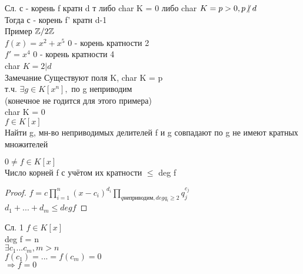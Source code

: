 Сл. с - корень f кратн d т либо char K = 0 либо char $K = p > 0, p \centernot| d $ \\
Тогда с - корень f' кратн d-1 \\
Пример $ \mathbb{Z} / 2\mathbb{Z}  $ \\
$ f(x) = x^2 + x^5 $ 0 - корень кратности 2 \\
$ f' = x^4 $  0 - корень кратности 4 \\
char $ K = 2 | d $ \\
Замечание Существуют поля K, char K = p \\
т.ч. $ \exists g \in K[x^n], $ по g неприводим \\
(конечное не годится для этого примера) \\
char K = 0 \\
$ f \in K[x] $\\
Найти g, мн-во неприводимых делителей f и g совпадают по g не имеют кратных множителей \\

\begin{theorem}
	$ 0 \neq f \in K[x] $\\
	Число корней f  с учётом их кратности $ \leq $ deg f \\
	\begin{proof}
		$ f = c \prod_{i=1}^{n} (x - c_i)^{d_i} \prod_{q \text{неприводим}, deg q_i \geq 2} q_j^{c_j} $ \\
		$ d_1 + ... +d_m \leq deg f $ 
	\end{proof} 
\end{theorem}
Сл. 1 $ f \in K[x] $ \\
deg f = n \\
$ \exists c_1 ... c_m, m > n $ \\
$ f(c_1) = ... = f(c_m) = 0 $ \\
$ \Rightarrow f = 0 $ \\


